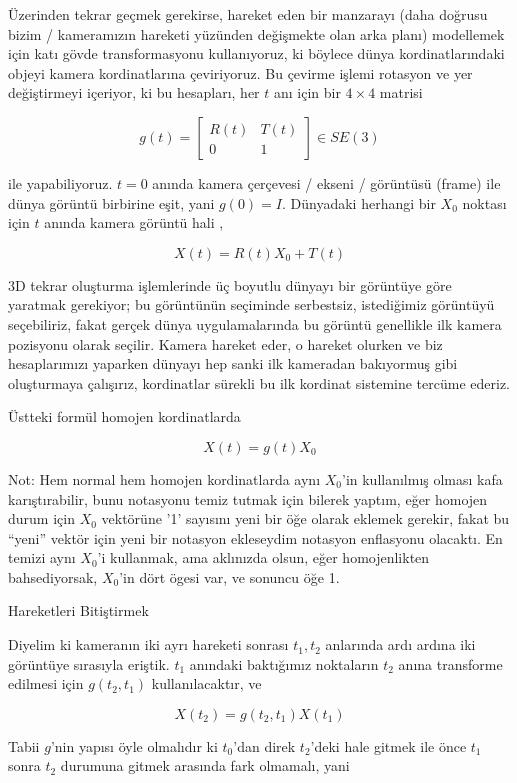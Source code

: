 \documentclass[12pt,fleqn]{article}\usepackage{../../common}
\begin{document}
Üzerinden tekrar geçmek gerekirse, hareket eden bir manzarayı (daha doğrusu
bizim / kameramızın hareketi yüzünden değişmekte olan arka planı)
modellemek için katı gövde transformasyonu kullanıyoruz, ki böylece dünya
kordinatlarındaki objeyi kamera kordinatlarına çeviriyoruz. Bu çevirme
işlemi rotasyon ve yer değiştirmeyi içeriyor, ki bu hesapları, her $t$ anı
için bir $4 \times 4$ matrisi

$$ g(t) = 
\left[\begin{array}{rrr}
R(t) & T(t) \\ 0 & 1
\end{array}\right] \in SE(3)
 $$

ile yapabiliyoruz. $t=0$ anında kamera çerçevesi / ekseni / görüntüsü
(frame) ile dünya görüntü birbirine eşit, yani $g(0) = I$. Dünyadaki
herhangi bir $X_0$ noktası için $t$ anında kamera görüntü hali ,

$$ X(t) = R(t)X_0 + T(t) $$

3D tekrar oluşturma işlemlerinde üç boyutlu dünyayı bir görüntüye göre
yaratmak gerekiyor; bu görüntünün seçiminde serbestsiz, istediğimiz
görüntüyü seçebiliriz, fakat gerçek dünya uygulamalarında bu görüntü
genellikle ilk kamera pozisyonu olarak seçilir. Kamera hareket eder, o
hareket olurken ve biz hesaplarımızı yaparken dünyayı hep sanki ilk
kameradan bakıyormuş gibi oluşturmaya çalışırız, kordinatlar sürekli bu ilk
kordinat sistemine tercüme ederiz. 

Üstteki formül homojen kordinatlarda

$$ X(t) = g(t) X_0 $$

Not: Hem normal hem homojen kordinatlarda aynı $X_0$'in kullanılmış olması
kafa karıştırabilir, bunu notasyonu temiz tutmak için bilerek yaptım, eğer
homojen durum için $X_0$ vektörüne '1' sayısını yeni bir öğe olarak eklemek
gerekir, fakat bu ``yeni'' vektör için yeni bir notasyon ekleseydim
notasyon enflasyonu olacaktı. En temizi aynı $X_0$'i kullanmak, ama
aklınızda olsun, eğer homojenlikten bahsediyorsak, $X_0$'in dört ögesi var,
ve sonuncu öğe 1. 

Hareketleri Bitiştirmek 

Diyelim ki kameranın iki ayrı hareketi sonrası $t_1,t_2$ anlarında ardı
ardına iki görüntüye sırasıyla eriştik. $t_1$ anındaki baktığımız
noktaların $t_2$ anına transforme edilmesi için $g(t_2,t_1)$
kullanılacaktır, ve 

$$ X(t_2) = g(t_2,t_1)X(t_1) $$

Tabii $g$'nin yapısı öyle olmalıdır ki $t_0$'dan direk $t_2$'deki hale
gitmek ile önce $t_1$ sonra $t_2$ durumuna gitmek arasında fark olmamalı,
yani
\end{document}
